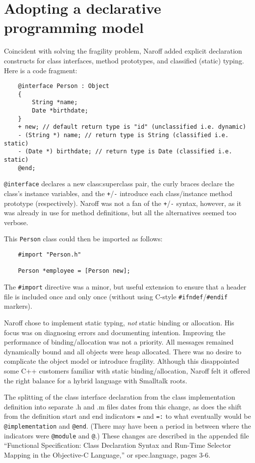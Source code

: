 \documentclass[acmsmall]{acmart}\settopmatter{}
\begin{document}
\section{Adopting a declarative programming model}
\label{sec-declarative}
Coincident with solving the fragility problem, Naroff added explicit declaration constructs for class interfaces, method prototypes, and classified (static) typing. Here is a code fragment:
\begin{verbatim}
    @interface Person : Object
    {
        String *name;
        Date *birthdate;
    }
    + new; // default return type is "id" (unclassified i.e. dynamic)
    - (String *) name; // return type is String (classified i.e. static)
    - (Date *) birthdate; // return type is Date (classified i.e. static)
    @end;
\end{verbatim}
\verb$@interface$ declares a new class:superclass pair, the curly braces declare the class's instance variables, and the \verb$+$/\verb$-$ introduce each class/instance method prototype (respectively). Naroff was not a fan of the \verb$+$/\verb$-$ syntax, however, as it was already in use for method definitions, but all the alternatives seemed too verbose.

This \verb$Person$ class could then be imported as follows:
\begin{verbatim}
    #import "Person.h"
    
    Person *employee = [Person new];
\end{verbatim}
The \verb$#import$ directive was a minor, but useful extension to ensure that a header file is included once and only once (without using C-style \verb$#ifndef$/\verb$#endif$ markers). 

Naroff chose to implement static typing, \emph{not} static binding or allocation. His focus was on diagnosing errors and documenting intention. Improving the performance of binding/allocation was not a priority. All messages remained dynamically bound and all objects were heap allocated. There was no desire to complicate the object model or introduce fragility. Although this disappointed some C++ customers familiar with static binding/allocation, Naroff felt it offered the right balance for a hybrid language with Smalltalk roots. 

The splitting of the class interface declaration from the class implementation definition into separate .h and .m files dates from this change, as does the shift from the definition start and end indicators \verb|=| and \verb|=:| to what eventually would be \verb|@implementation| and \verb|@end|. (There may have been a period in between where the indicators were \verb|@module| and \verb|@|.)
These changes are described in the appended file ``Functional Specification: Class Declaration Syntax and Run-Time Selector Mapping in the Objective-C Language,'' or spec.language, pages 3-6.
\end{document}
